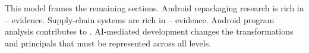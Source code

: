 This model frames the remaining sections. Android repackaging research is rich in -- evidence. Supply-chain systems are rich in -- evidence. Android program analysis contributes to . AI-mediated development changes the transformations and principals that must be represented across all levels.
